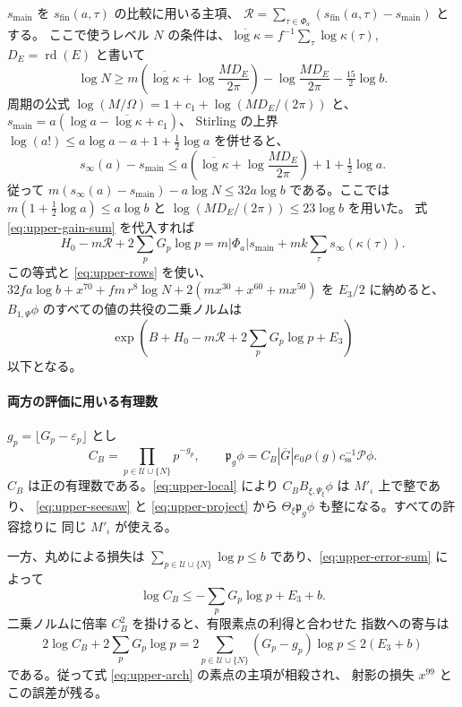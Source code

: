 \(s_{\mathrm{main}}\) を \(s_{\mathrm{fin}}(a,\tau)\) の比較に用いる主項、
\(\mathcal R=\sum_{\tau\in\Phi_a}(s_{\mathrm{fin}}(a,\tau)-s_{\mathrm{main}})\) とする。
ここで使うレベル \(N\) の条件は、\(\overline{\log\kappa}
=f^{-1}\sum_\tau\log\kappa(\tau)\), \(D_E=\operatorname{rd}(E)\) と書いて
\[
 \log N\ge m\!\left(\overline{\log\kappa}
                 +\log \frac{M D_E}{2\pi}\right)
          -\log\frac{M D_E}{2\pi}-\tfrac{15}2\log b.
\]
周期の公式
\(\log(M/\Omega)=1+c_1+\log(M D_E/(2\pi))\) と、
\(s_{\mathrm{main}}=a(\log a-\overline{\log\kappa}+c_1)\)、
Stirling の上界
\(\log(a!)\le a\log a-a+1+\frac12\log a\) を併せると、
\[
 s_\infty(a)-s_{\mathrm{main}}
 \le a\!\left(\overline{\log\kappa}+\log \frac{M D_E}{2\pi}\right)
        +1+\tfrac12\log a .
\]
従って \(m(s_\infty(a)-s_{\mathrm{main}})-a\log N\le32a\log b\)
である。ここでは
\(m(1+\frac12\log a)\le a\log b\) と
\(\log(M D_E/(2\pi))\le23\log b\) を用いた。
式 \eqref{eq:upper-gain-sum} を代入すれば
\[
 H_0-m\mathcal R+2\sum_p G_p\log p
 =m|\Phi_a|s_{\mathrm{main}}+mk\sum_\tau s_\infty(\kappa(\tau)).
\]
この等式と \eqref{eq:upper-rows} を使い、
\(32fa\log b+x^{70}+fm\,r^8\log N+
  2(mx^{30}+x^{60}+mx^{50})\) を \(E_3/2\) に納めると、
\(B_{1,\Psi}\phi\) のすべての値の共役の二乗ノルムは
\begin{equation}\label{eq:upper-arch}
  \exp\!\left(B+H_0-m\mathcal R+2\sum_p G_p\log p+E_3\right)
\end{equation}
以下となる。

\paragraph{両方の評価に用いる有理数}
\(g_p=\lfloor G_p-\varepsilon_p\rfloor\) とし
\[
 C_B=\prod_{p\in\mathcal U\cup\{N\}}p^{-g_p},\qquad
 \mathfrak p_g\phi
   = C_B|\overline G|e_0\rho(g)c_{\mathrm{ss}}^{-1}\mathcal P\phi .
\]
\(C_B\) は正の有理数である。\eqref{eq:upper-local} により
\(C_B B_{\xi,\Psi_\xi}\phi\) は \(M'_\iota\) 上で整であり、
\eqref{eq:upper-seesaw} と \eqref{eq:upper-project} から
\(\Theta_\xi\mathfrak p_g\phi\) も整になる。すべての許容捻りに
同じ \(M'_\iota\) が使える。

一方、丸めによる損失は \(\sum_{p\in\mathcal U\cup\{N\}}\log p\le b\)
であり、\eqref{eq:upper-error-sum} によって
\begin{equation}\label{eq:upper-cb}
 \log C_B\le-\sum_p G_p\log p+E_3+b .
\end{equation}
二乗ノルムに倍率 \(C_B^2\) を掛けると、有限素点の利得と合わせた
指数への寄与は
\[
 2\log C_B+2\sum_p G_p\log p
    =2\sum_{p\in\mathcal U\cup\{N\}}(G_p-g_p)\log p
    \le 2(E_3+b)
\]
である。従って式 \eqref{eq:upper-arch} の素点の主項が相殺され、
射影の損失 \(x^{99}\) とこの誤差が残る。

